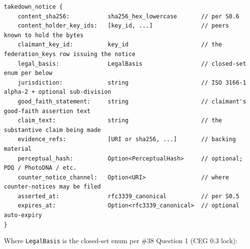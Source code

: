 \documentclass[10pt]{article}
\begin{document}
\begin{lstlisting}
takedown_notice {
    content_sha256:           sha256_hex_lowercase       // per S0.6
    content_holder_key_ids:   [key_id, ...]              // peers known to hold the bytes
    claimant_key_id:          key_id                     // the federation_keys row issuing the notice
    legal_basis:              LegalBasis                 // closed-set enum per below
    jurisdiction:             string                     // ISO 3166-1 alpha-2 + optional sub-division
    good_faith_statement:     string                     // claimant's good-faith assertion text
    claim_text:               string                     // the substantive claim being made
    evidence_refs:            [URI or sha256, ...]       // backing material
    perceptual_hash:          Option<PerceptualHash>     // optional; PDQ / PhotoDNA / etc.
    counter_notice_channel:   Option<URI>                // where counter-notices may be filed
    asserted_at:              rfc3339_canonical          // per S0.5
    expires_at:               Option<rfc3339_canonical>  // optional auto-expiry
}
\end{lstlisting}

Where \texttt{LegalBasis} is the closed-set enum per \#38 Question 1 (CEG 0.3 lock):
\end{document}
